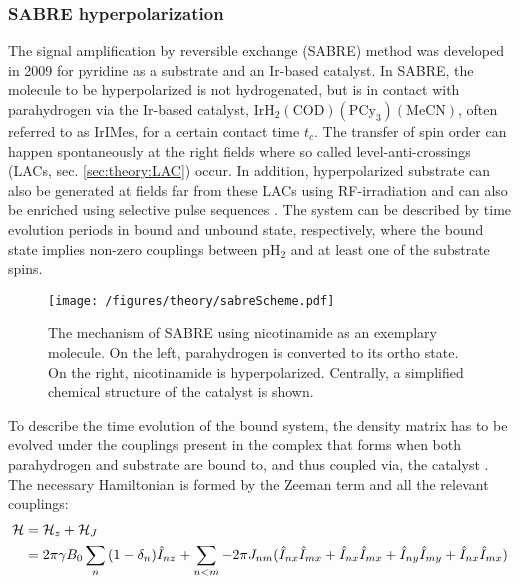         \subsubsection{SABRE hyperpolarization}
        \label{sec:theory:HPSabre}
        The signal amplification by reversible exchange (SABRE) method was developed in 2009 \cite{adams_reversible_2009-2} for pyridine as a substrate and an Ir-based catalyst.
        In SABRE, the molecule to be hyperpolarized is not hydrogenated, but is in contact with parahydrogen via the Ir-based catalyst, $\mathrm{IrH_2(COD)(PCy_3)(MeCN)}$, often referred to as IrIMes, for a certain contact time $t_c$. The transfer of spin order can happen spontaneously at the right fields \cite{atkinson_spontaneous_2009-1} where so called level-anti-crossings (LACs, sec. \ref{sec:theory:LAC}) occur. In addition, hyperpolarized substrate can also be generated at fields far from these LACs using RF-irradiation \cite{pravdivtsev_spin_2014, knecht_quantitative_2019} and can also be enriched using selective pulse sequences \cite{knecht_re-polarization_2018-1}. The system can be described by time evolution periods in bound and unbound state, respectively, where the bound state implies non-zero couplings between pH$_2$ and at least one of the substrate spins.
            \begin{figure}
                \centering
                \texttt{[image: /figures/theory/sabreScheme.pdf]}
                \caption[SABRE scheme]{The mechanism of SABRE using nicotinamide as an exemplary molecule. On the left, parahydrogen is converted to its ortho state. On the right, nicotinamide is hyperpolarized. Centrally, a simplified chemical structure of the catalyst is shown.}
            \end{figure}
            To describe the time evolution of the bound system, the density matrix has to be evolved under the couplings present in the complex that forms when both parahydrogen and substrate are bound to, and thus coupled via, the catalyst \cite{cowley_iridium_2011-1}. The necessary Hamiltonian is formed by the Zeeman term and all the relevant couplings:
            \begin{equation}
                \begin{aligned}
                    \mathcal{H}& = \mathcal{H}_z + \mathcal{H}_J \\
                        & =\-2\pi\gamma B_0 \sum_n{(1-\delta_n)\hat{I}_{nz}} + \sum_{n<m} -2\pi J_{nm}(\hat{I}_{nx}\hat{I}_{mx} + \hat{I}_{nx}\hat{I}_{mx}+ \hat{I}_{ny}\hat{I}_{my} + \hat{I}_{nx}\hat{I}_{mx})
                \end{aligned}
            \end{equation}
